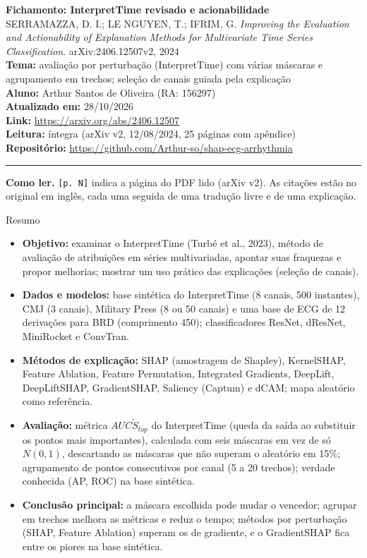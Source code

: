 \documentclass[11pt,a4paper]{article}
\begin{document}
\begin{center}
    {\LARGE \textbf{Fichamento: InterpretTime revisado e acionabilidade}} \\[0.35em]
    {\large SERRAMAZZA, D. I.; LE NGUYEN, T.; IFRIM, G. \textit{Improving the Evaluation and Actionability of Explanation Methods for Multivariate Time Series Classification}. arXiv:2406.12507v2, 2024} \\[0.3em]
    \textbf{Tema:} avaliação por perturbação (InterpretTime) com várias máscaras e agrupamento em trechos; seleção de canais guiada pela explicação \\[0.2em]
    \textbf{Aluno:} Arthur Santos de Oliveira (RA: 156297) \\[0.2em]
    \textbf{Atualizado em:} 28/10/2026 \\[0.2em]
    \textbf{Link:} \url{https://arxiv.org/abs/2406.12507} \\[0.2em]
    \textbf{Leitura:} íntegra (arXiv v2, 12/08/2024, 25 páginas com apêndice) \\[0.2em]
    \textbf{Repositório:} \url{https://github.com/Arthur-so/shap-ecg-arrhythmia}
\end{center}
\vspace{-0.5em}
\hrule
\vspace{0.8em}

\textbf{Como ler.} \texttt{[p. N]} indica a página do PDF lido (arXiv v2). As citações estão no original em inglês, cada uma seguida de uma tradução livre e de uma explicação.

\begin{infobox}[note]{Resumo}
\begin{itemize}
\item \textbf{Objetivo:} examinar o InterpretTime (Turbé et al., 2023), método de avaliação de atribuições em séries multivariadas, apontar suas fraquezas e propor melhorias; mostrar um uso prático das explicações (seleção de canais).
\item \textbf{Dados e modelos:} base sintética do InterpretTime (8 canais, 500 instantes), CMJ (3 canais), Military Press (8 ou 50 canais) e uma base de ECG de 12 derivações para BRD (comprimento 450); classificadores ResNet, dResNet, MiniRocket e ConvTran.
\item \textbf{Métodos de explicação:} SHAP (amostragem de Shapley), KernelSHAP, Feature Ablation, Feature Permutation, Integrated Gradients, DeepLift, DeepLiftSHAP, GradientSHAP, Saliency (Captum) e dCAM; mapa aleatório como referência.
\item \textbf{Avaliação:} métrica $AUC\tilde{S}_{top}$ do InterpretTime (queda da saída ao substituir os pontos mais importantes), calculada com seis máscaras em vez de só $N(0,1)$, descartando as máscaras que não superam o aleatório em 15\%; agrupamento de pontos consecutivos por canal (5 a 20 trechos); verdade conhecida (AP, ROC) na base sintética.
\item \textbf{Conclusão principal:} a máscara escolhida pode mudar o vencedor; agrupar em trechos melhora as métricas e reduz o tempo; métodos por perturbação (SHAP, Feature Ablation) superam os de gradiente, e o GradientSHAP fica entre os piores na base sintética.
\end{itemize}
\end{infobox}
\end{document}

